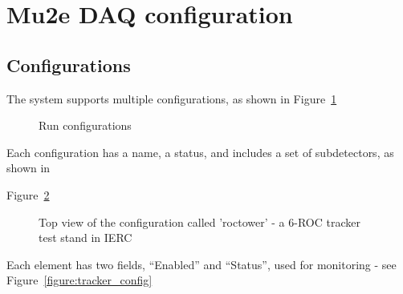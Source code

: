 \section{Mu2e DAQ configuration}

\subsection{Configurations}

The system supports multiple configurations, as shown in Figure~\ref{figure:run_configurations}

\begin{figure}[H]
  \caption{
    \label{figure:run_configurations}
    Run configurations
  }
\end{figure}

Each configuration has a name, a status, and includes a set of subdetectors, as shown in

Figure~\ref{figure:configuration_top}

\begin{figure}[H]
  \caption{
    \label{figure:configuration_top}
    Top view of the configuration called 'roctower' - a 6-ROC tracker test stand in IERC
  }
\end{figure}

Each element has two fields, ``Enabled'' and ``Status'', used for monitoring - see
Figure~\ref{figure:tracker_config}

